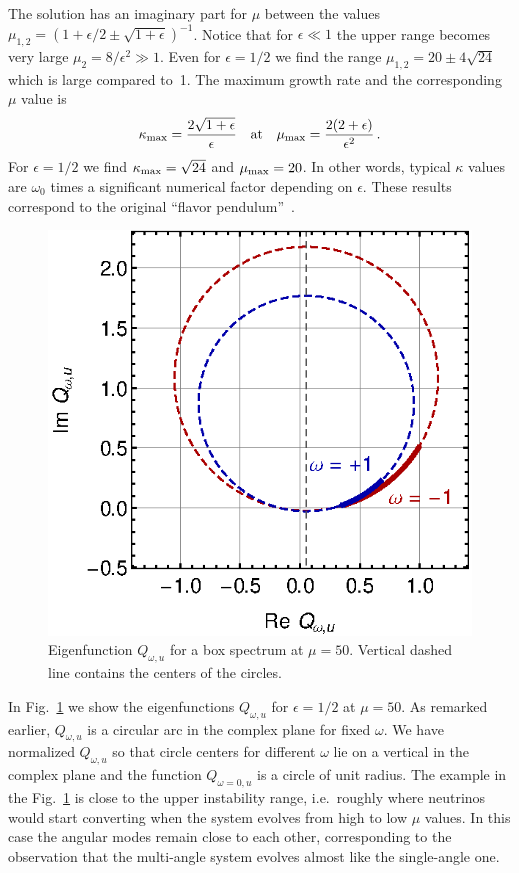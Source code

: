 \documentclass[twocolumn,prd,showpacs,
floatfix,preprintnumbers,nofootinbib]{revtex4}
\begin{document}
The solution has an imaginary part for $\mu$ between the values
$\mu_{1,2}=(1+\epsilon/2\pm\sqrt{1+\epsilon})^{-1}$. Notice that for
$\epsilon\ll 1$ the upper range becomes very large
$\mu_2=8/\epsilon^2\gg1$. Even for $\epsilon=1/2$ we find the range
$\mu_{1,2}=20\pm4\sqrt{24}$ which is large compared to~1. The
maximum growth rate and the corresponding $\mu$ value is
\begin{equation}
\kappa_{\rm max}=\frac{2\sqrt{1+\epsilon}}{\epsilon}
\quad\hbox{at}\quad \mu_{\rm max}=\frac{2(2+\epsilon)}{\epsilon^2}\,.
\end{equation}
For $\epsilon=1/2$ we find $\kappa_{\rm max}=\sqrt{24}$ and
$\mu_{\rm max}=20$. In other words, typical $\kappa$ values are
$\omega_0$ times a significant numerical factor depending on
$\epsilon$. These results correspond to the original ``flavor
pendulum''~\cite{Hannestad:2006nj}.

\begin{figure}
\includegraphics[width=0.8\columnwidth]{vec2s.eps}
\caption{Eigenfunction $Q_{\omega,u}$ for a box spectrum at $\mu=50$. Vertical dashed line contains the centers of the circles.
\label{fig:vec1}}
\end{figure}

In Fig.~\ref{fig:vec1} we show the eigenfunctions $Q_{\omega,u}$ for $\epsilon=1/2$ at $\mu=50$.
As remarked earlier,
$Q_{\omega,u}$ is a circular arc in the complex plane for fixed
$\omega$. We have normalized $Q_{\omega,u}$ so that circle centers for different $\omega$ lie on a vertical in the complex plane and the function $Q_{\omega=0,u}$ is a circle of unit radius.
The example in the Fig.~\ref{fig:vec1} is close to the upper instability range, i.e.\ roughly where neutrinos would start converting when the system evolves from high to low $\mu$ values.
In this case the angular modes remain close to each other, corresponding to the observation that the multi-angle system evolves almost like the single-angle one.
\end{document}
